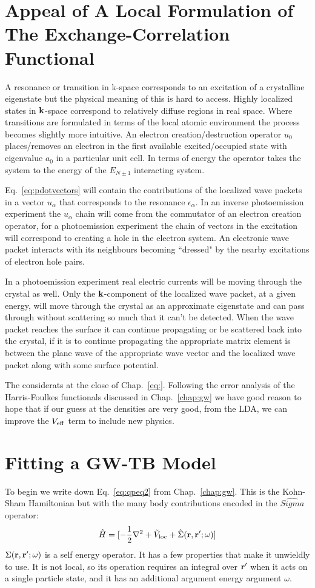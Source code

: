 \section{Appeal of A Local Formulation of The Exchange-Correlation Functional}
A resonance or transition in k-space corresponds to an excitation 
of a crystalline eigenstate but the physical meaning of this is hard to access. Highly
localized states in ${\bf k}$-space correspond to relatively diffuse regions in real space. Where
transitions are formulated in terms of the local atomic environment the process becomes slightly
more intuitive. An electron creation/destruction operator $u_{0}$ places/removes an electron in the 
first available excited/occupied state with eigenvalue $a_{0}$ in a particular unit cell. 
In terms of energy the operator takes the system to the energy 
of the $E_{N\pm1}$ interacting system. 

Eq.~\ref{eq:pdotvectors} will contain the contributions of the localized
wave packets in a vector $u_{\alpha}$ that corresponds to the resonance 
$\epsilon_{\alpha}$. In an inverse photoemission experiment the $u_{\alpha}$ chain
will come from the commutator of an electron creation operator, for a photoemission
experiment the chain of vectors in the excitation will correspond to creating a hole
in the electron system. An electronic wave packet interacts with its neighbours becoming
``dressed" by the nearby excitations of electron hole pairs. 

In a photoemission experiment real electric currents will be moving through 
the crystal as well. Only the ${\bf k}$-component of the localized wave packet, 
at a given energy, will move through the crystal as 
an approximate eigenstate and can pass through without scattering 
so much that it can't be detected.
When the wave packet reaches the surface it can continue propagating
or be scattered back into the crystal, if it is to continue 
propagating the appropriate matrix element
is between the plane wave of the appropriate wave vector and 
the localized wave packet along with some surface potential.

The considerats at the close of Chap.~\ref{eq:}. Following the error 
analysis of the Harris-Foulkes functionals discussed in Chap.~\ref{chap:gw} 
we have good reason to hope that if our guess at the densities are very good, 
from the LDA, we can improve the $V_{\rm eff}$ term to include new physics.

\section{Fitting a GW-TB Model}
To begin we write down Eq.~\ref{eq:qpeq2} from Chap.~\ref{chap:gw}.
This is the Kohn-Sham Hamiltonian but with the many body contributions
encoded in the $\hat{Sigma}$ operator:
%
\begin{equation}
\hat{H} = [-\frac{1}{2}\nabla^{2} + \tilde{V}_{\rm loc} + \hat{\Sigma}({\bf r},{\bf r}';\omega)]
\end{equation}
%
$\Sigma({\bf r},{\bf r}';\omega)$ is a self energy operator. It has a few properties
that make it unwieldly to use. It is not local, so its operation requires an integral over
${\bf r}'$ when it acts on a single particle state, and it has an additional argument 
energy argument $\omega$. 

